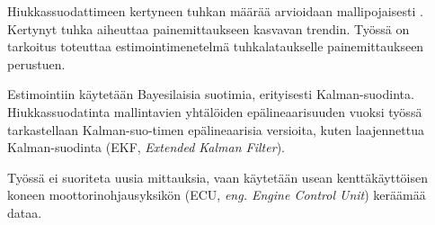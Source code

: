 Hiukkassuodattimeen kertyneen tuhkan määrää arvioidaan mallipojaisesti \cite{??}. 
Kertynyt tuhka aiheuttaa painemittaukseen kasvavan trendin. Työssä on tarkoitus toteuttaa estimointimenetelmä tuhkalataukselle painemittaukseen perustuen.

Estimointiin käytetään Bayesilaisia suotimia, erityisesti Kalman-suodinta. Hiukkassuodatinta mallintavien yhtälöiden epälineaarisuuden vuoksi työssä tarkastellaan Kalman-suo-timen epälineaarisia versioita, kuten laajennettua Kalman-suodinta (EKF, \emph{Extended Kalman Filter}).

Työssä ei suoriteta uusia mittauksia, vaan käytetään usean kenttäkäyttöisen koneen moottorinohjausyksikön (ECU, \emph{eng. Engine Control Unit}) keräämää dataa. 